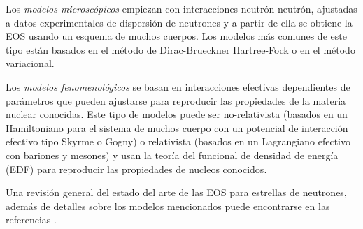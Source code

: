 Los \emph{modelos microscópicos} empiezan con interacciones neutrón-neutrón, ajustadas a datos experimentales de dispersión de neutrones y a partir de ella se obtiene la EOS usando un esquema de muchos cuerpos. Los modelos más comunes de este tipo están basados en el método de Dirac-Brueckner Hartree-Fock o en el método variacional.

Los \emph{modelos fenomenológicos} se basan en interacciones efectivas dependientes de parámetros que pueden ajustarse para reproducir las propiedades de la materia nuclear conocidas. Este tipo de modelos puede ser no-relativista (basados en un Hamiltoniano para el sistema de muchos cuerpo con un potencial de interacción efectivo tipo Skyrme o Gogny) o relativista (basados en un Lagrangiano efectivo con bariones y mesones) y usan la teoría del funcional de densidad de energía (EDF) para reproducir las propiedades de nucleos conocidos.

Una revisión general del estado del arte de las EOS para estrellas de neutrones, además de detalles sobre los modelos mencionados puede encontrarse en las referencias \cite{Haensel2007,Rezzolla2018}.






